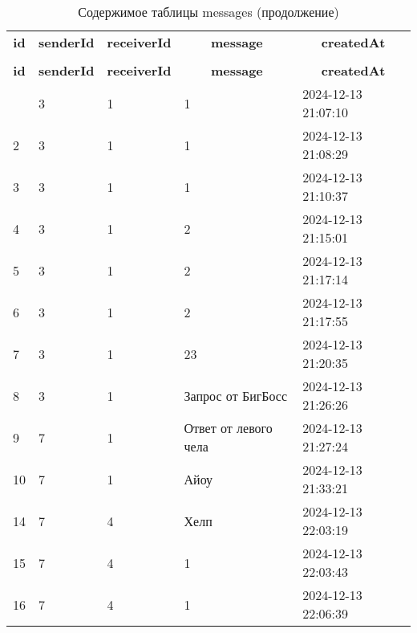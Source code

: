%
%
 \begin{longtable}{|l|l|l|l|l|} 
 \hline \endhead \hline \endfoot \hline 
 \caption{Содержимое таблицы messages} \label{tab:messages-data} \\\hline \multicolumn{1}{|c|}{\textbf{id}} & \multicolumn{1}{|c|}{\textbf{senderId}} & \multicolumn{1}{|c|}{\textbf{receiverId}} & \multicolumn{1}{|c|}{\textbf{message}} & \multicolumn{1}{|c|}{\textbf{createdAt}} \\ \hline \hline  \endfirsthead 
\caption{Содержимое таблицы messages (продолжение)} \\ \hline \multicolumn{1}{|c|}{\textbf{id}} & \multicolumn{1}{|c|}{\textbf{senderId}} & \multicolumn{1}{|c|}{\textbf{receiverId}} & \multicolumn{1}{|c|}{\textbf{message}} & \multicolumn{1}{|c|}{\textbf{createdAt}} \\ \hline \hline \endhead \endfoot
1 & 3 & 1 & 1 & 2024-12-13 21:07:10 \\ \hline 
2 & 3 & 1 & 1 & 2024-12-13 21:08:29 \\ \hline 
3 & 3 & 1 & 1 & 2024-12-13 21:10:37 \\ \hline 
4 & 3 & 1 & 2 & 2024-12-13 21:15:01 \\ \hline 
5 & 3 & 1 & 2 & 2024-12-13 21:17:14 \\ \hline 
6 & 3 & 1 & 2 & 2024-12-13 21:17:55 \\ \hline 
7 & 3 & 1 & 23 & 2024-12-13 21:20:35 \\ \hline 
8 & 3 & 1 & Запрос от БигБосс & 2024-12-13 21:26:26 \\ \hline 
9 & 7 & 1 & Ответ от левого чела & 2024-12-13 21:27:24 \\ \hline 
10 & 7 & 1 & Айоу & 2024-12-13 21:33:21 \\ \hline 
14 & 7 & 4 & Хелп & 2024-12-13 22:03:19 \\ \hline 
15 & 7 & 4 & 1 & 2024-12-13 22:03:43 \\ \hline 
16 & 7 & 4 & 1 & 2024-12-13 22:06:39 \\ \hline 
 \end{longtable}

